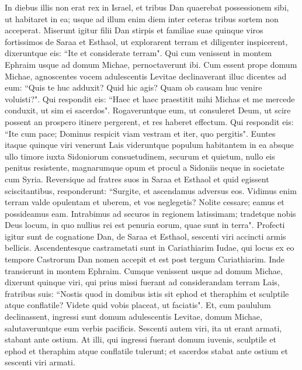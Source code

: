 \begin{biblechapter}  
\verse In diebus illis non erat rex in Israel, et tribus Dan quaerebat possessionem sibi, ut habitaret in ea; usque ad illum enim diem inter ceteras tribus sortem non acceperat. 
\verse Miserunt igitur filii Dan stirpis et familiae suae quinque viros fortissimos de Saraa et Esthaol, ut explorarent terram et diligenter inspicerent, dixeruntque eis: “Ite et considerate terram". Qui cum venissent in montem Ephraim usque ad domum Michae, pernoctaverunt ibi. 
\verse Cum essent prope domum Michae, agnoscentes vocem adulescentis Levitae declinaverant illuc dicentes ad eum: “Quis te huc adduxit? Quid hic agis? Quam ob causam huc venire voluisti?". 
\verse Qui respondit eis: “Haec et haec praestitit mihi Michas et me mercede conduxit, ut sim ei sacerdos". 
\verse Rogaveruntque eum, ut consuleret Deum, ut scire possent an prospero itinere pergerent, et res haberet effectum. 
\verse Qui respondit eis: “Ite cum pace; Dominus respicit viam vestram et iter, quo pergitis". 
\verse Euntes itaque quinque viri venerunt Lais videruntque populum habitantem in ea absque ullo timore iuxta Sidoniorum consuetudinem, securum et quietum, nullo eis penitus resistente, magnarumque opum et procul a Sidoniis neque in societate cum Syria. 
\verse Reversique ad fratres suos in Saraa et Esthaol et quid egissent sciscitantibus, responderunt: 
\verse “Surgite, et ascendamus adversus eos. Vidimus enim terram valde opulentam et uberem, et vos neglegetis? Nolite cessare; eamus et possideamus eam. 
\verse Intrabimus ad securos in regionem latissimam; tradetque nobis Deus locum, in quo nullius rei est penuria eorum, quae sunt in terra". 
\verse Profecti igitur sunt de cognatione Dan, de Saraa et Esthaol, sescenti viri accincti armis bellicis. 
\verse Ascendentesque castrametati sunt in Cariathiarim Iudae, qui locus ex eo tempore Castrorum Dan nomen accepit et est post tergum Cariathiarim. 
\verse Inde transierunt in montem Ephraim. Cumque venissent usque ad domum Michae, 
\verse dixerunt quinque viri, qui prius missi fuerant ad considerandam terram Lais, fratribus suis: “Nostis quod in domibus istis sit ephod et theraphim et sculptile atque conflatile? Videte quid vobis placeat, ut faciatis". 
\verse Et, cum paululum declinassent, ingressi sunt domum adulescentis Levitae, domum Michae, salutaveruntque eum verbis pacificis. 
\verse Sescenti autem viri, ita ut erant armati, stabant ante ostium. 
\verse At illi, qui ingressi fuerant domum iuvenis, sculptile et ephod et theraphim atque conflatile tulerunt; et sacerdos stabat ante ostium et sescenti viri armati.  

\end{biblechapter}
